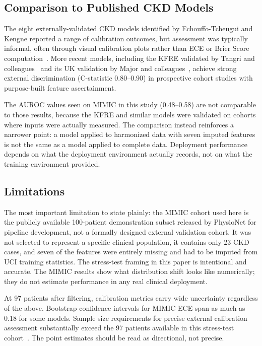 \subsection{Comparison to Published CKD Models}

The eight externally-validated CKD models identified by Echouffo-Tcheugui and Kengne reported a range of calibration outcomes, but assessment was typically informal, often through visual calibration plots rather than ECE or Brier Score computation~\cite{EchouffoTcheugui2012}. More recent models, including the KFRE validated by Tangri and colleagues~\cite{Tangri2016} and its UK validation by Major and colleagues~\cite{Major2019}, achieve strong external discrimination (C-statistic 0.80--0.90) in prospective cohort studies with purpose-built feature ascertainment.

The AUROC values seen on MIMIC in this study (0.48--0.58) are not comparable to those results, because the KFRE and similar models were validated on cohorts where inputs were actually measured. The comparison instead reinforces a narrower point: a model applied to harmonized data with seven imputed features is not the same as a model applied to complete data. Deployment performance depends on what the deployment environment actually records, not on what the training environment provided.

\subsection{Limitations}

The most important limitation to state plainly: the MIMIC cohort used here is the publicly available 100-patient demonstration subset released by PhysioNet for pipeline development, not a formally designed external validation cohort. It was not selected to represent a specific clinical population, it contains only 23 CKD cases, and seven of the features were entirely missing and had to be imputed from UCI training statistics. The stress-test framing in this paper is intentional and accurate. The MIMIC results show what distribution shift looks like numerically; they do not estimate performance in any real clinical deployment.

At 97 patients after filtering, calibration metrics carry wide uncertainty regardless of the above. Bootstrap confidence intervals for MIMIC ECE span as much as 0.18 for some models. Sample size requirements for precise external calibration assessment substantially exceed the 97 patients available in this stress-test cohort~\cite{Riley2024EvalPart3}. The point estimates should be read as directional, not precise.

